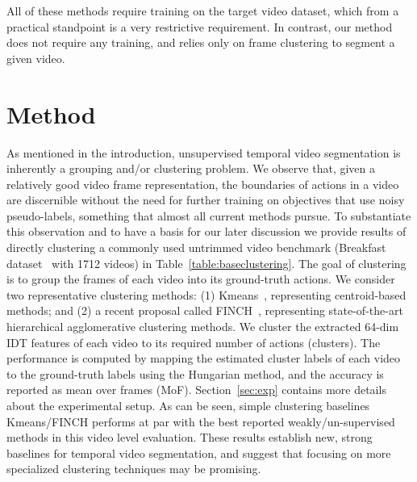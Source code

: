 \documentclass[10pt,twocolumn,letterpaper]{article}
\begin{document}
All of these methods require training on the target video dataset, which from a practical standpoint is a very restrictive requirement. 
In contrast,
our method does not require any training, and relies only on frame clustering to segment a given video. \section{Method} \label{sec:method}
As mentioned in the introduction, unsupervised temporal video segmentation is inherently a grouping and/or clustering problem. We observe that, given a relatively good video frame representation, the boundaries of actions in a video are discernible without the need for further training on objectives that use noisy pseudo-labels, something that almost all current methods pursue. To substantiate this observation and to have a basis for our later discussion we provide results of directly clustering a commonly used untrimmed video benchmark (Breakfast dataset~\cite{ute_15} with 1712 videos) in Table~\ref{table:baseclustering}.
The goal of clustering is to group the frames of each video into its ground-truth actions.
We consider two representative clustering methods: (1) Kmeans~\cite{kmeans}, representing centroid-based methods; and (2) a recent proposal called FINCH~\cite{finch}, representing state-of-the-art hierarchical agglomerative clustering methods. We cluster the extracted 64-dim IDT features of each video to its required number of actions (clusters). The performance is computed by mapping the estimated cluster labels of each video to the ground-truth labels using the Hungarian method, and the accuracy is reported as mean over frames (MoF). Section~\ref{sec:exp} contains more details about the experimental setup.
As can be seen, simple clustering baselines Kmeans/FINCH performs at par with the best reported weakly/un-supervised methods in this video level evaluation.
These results establish new, strong baselines for temporal video segmentation, and suggest that focusing on more specialized clustering techniques may be promising.
\end{document}
